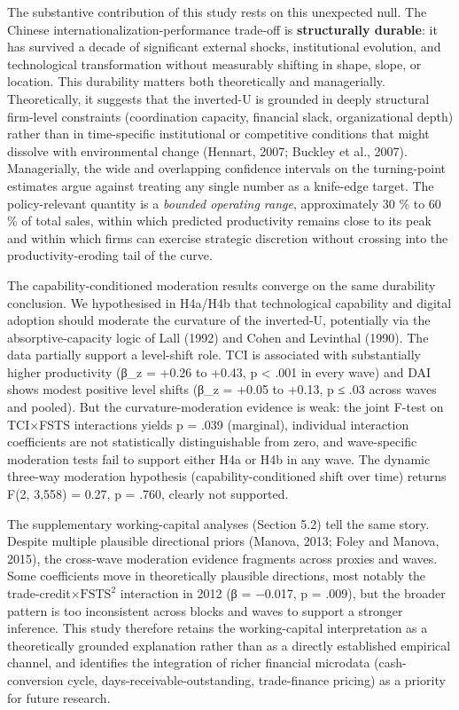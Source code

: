 \documentclass[12pt,a4paper]{article}
\begin{document}
The substantive contribution of this study rests on this unexpected
null. The Chinese internationalization-performance trade-off is
\textbf{structurally durable}: it has survived a decade of significant
external shocks, institutional evolution, and technological
transformation without measurably shifting in shape, slope, or location.
This durability matters both theoretically and managerially.
Theoretically, it suggests that the inverted-U is grounded in deeply
structural firm-level constraints (coordination capacity, financial
slack, organizational depth) rather than in time-specific institutional
or competitive conditions that might dissolve with environmental change
(Hennart, 2007; Buckley et al., 2007). Managerially, the wide and
overlapping confidence intervals on the turning-point estimates argue
against treating any single number as a knife-edge target. The
policy-relevant quantity is a \emph{bounded operating range},
approximately 30 \% to 60 \% of total sales, within which predicted
productivity remains close to its peak and within which firms can
exercise strategic discretion without crossing into the
productivity-eroding tail of the curve.

The capability-conditioned moderation results converge on the same
durability conclusion. We hypothesised in H4a/H4b that technological
capability and digital adoption should moderate the curvature of the
inverted-U, potentially via the absorptive-capacity logic of Lall (1992)
and Cohen and Levinthal (1990). The data partially support a level-shift
role. TCI is associated with substantially higher productivity (β\_z =
+0.26 to +0.43, p \textless{} .001 in every wave) and DAI shows modest
positive level shifts (β\_z = +0.05 to +0.13, p ≤ .03 across waves and
pooled). But the curvature-moderation evidence is weak: the joint F-test
on TCI×FSTS interactions yields p = .039 (marginal), individual
interaction coefficients are not statistically distinguishable from
zero, and wave-specific moderation tests fail to support either H4a or
H4b in any wave. The dynamic three-way moderation hypothesis
(capability-conditioned shift over time) returns F(2, 3,558) = 0.27, p =
.760, clearly not supported.

The supplementary working-capital analyses (Section 5.2) tell the same
story. Despite multiple plausible directional priors (Manova, 2013;
Foley and Manova, 2015), the cross-wave moderation evidence fragments
across proxies and waves. Some coefficients move in theoretically
plausible directions, most notably the trade-credit×\(\mathrm{FSTS}^2\)
interaction in 2012 (β = −0.017, p = .009), but the broader pattern is
too inconsistent across blocks and waves to support a stronger
inference. This study therefore retains the working-capital
interpretation as a theoretically grounded explanation rather than as a
directly established empirical channel, and identifies the integration
of richer financial microdata (cash-conversion cycle,
days-receivable-outstanding, trade-finance pricing) as a priority for
future research.
\end{document}
